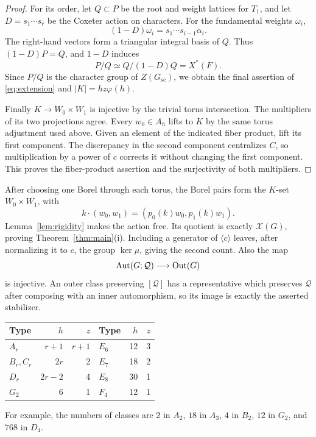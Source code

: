 \documentclass[11pt]{article}
\newcommand{\Out}{\operatorname{Out}}\newcommand{\Inn}{\operatorname{Inn}}
\theoremstyle{definition}\newtheorem{definition}[theorem]{Definition}
\theoremstyle{remark}\newtheorem{remark}[theorem]{Remark}
\begin{document}
\begin{proof}
For its order, let $Q\subset P$ be the root and weight lattices for $T_1$, and let $D=s_1\cdots s_r$ be the Coxeter action on characters. For the fundamental weights $\omega_i$,
\[
 (1-D)\omega_i=s_1\cdots s_{i-1}\alpha_i.
\]
The right-hand vectors form a triangular integral basis of $Q$. Thus $(1-D)P=Q$, and $1-D$ induces
\[
 P/Q\simeq Q/(1-D)Q=X^*(F).
\]
Since $P/Q$ is the character group of $Z(G_{\mathrm{sc}})$, we obtain the final assertion of \eqref{eq:extension} and $|K|=hz\varphi(h)$.

Finally $K\to W_0\times W_1$ is injective by the trivial torus intersection. The multipliers of its two projections agree. Every $w_0\in A_h$ lifts to $K$ by the same torus adjustment used above. Given an element of the indicated fiber product, lift its first component. The discrepancy in the second component centralizes $C$, so multiplication by a power of $c$ corrects it without changing the first component. This proves the fiber-product assertion and the surjectivity of both multipliers.
\end{proof}

After choosing one Borel through each torus, the Borel pairs form the $K$-set $W_0\times W_1$, with
\[
 k\cdot(w_0,w_1)=(p_0(k)w_0,p_1(k)w_1).
\]
Lemma~\ref{lem:rigidity} makes the action free. Its quotient is exactly $\mathcal X(G)$, proving Theorem~\ref{thm:main}(i). Including a generator of $\langle c\rangle$ leaves, after normalizing it to $c$, the group $\ker\mu$, giving the second count. Also the map
\[
 \Aut(G;\mathcal Q)\longrightarrow\Out(G)
\]
is injective. An outer class preserving $[\mathcal Q]$ has a representative which preserves $\mathcal Q$ after composing with an inner automorphism, so its image is exactly the asserted stabilizer.

\begin{center}
\begin{tabular}{lrr@{\qquad}lrr}
\toprule
Type&$h$&$z$&Type&$h$&$z$\\\midrule
$A_r$&$r+1$&$r+1$&$E_6$&12&3\\
$B_r,C_r$&$2r$&2&$E_7$&18&2\\
$D_r$&$2r-2$&4&$E_8$&30&1\\
$G_2$&6&1&$F_4$&12&1\\\bottomrule
\end{tabular}
\end{center}
For example, the numbers of classes are $2$ in $A_2$, $18$ in $A_3$, $4$ in $B_2$, $12$ in $G_2$, and $768$ in $D_4$.
\end{document}
